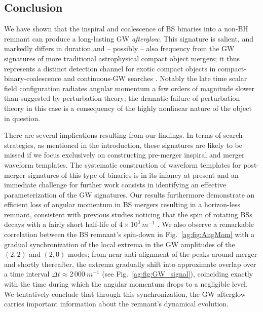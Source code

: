 \subsection{Conclusion}\label{ag:sec:conclusion}


We have shown that the inspiral and
coalescence of BS binaries into a non-BH remnant can produce a long-lasting GW {\it afterglow}.
This signature is salient, and markedly differs in duration and -- possibly -- also
frequency from the GW signatures of more traditional astrophysical compact object mergers;
it thus represents a distinct detection channel for exotic compact objects
in compact-binary-coalescence and continuous-GW searches
\cite{LIGOScientific:2019yhl,KAGRA:2021una,LIGOScientific:2021jlr,LIGOScientific:2021oez,LIGOScientific:2022lsr,LIGOScientific:2022pjk,LIGOScientific:2021hvc,LIGOScientific:2021ozr}.
\color{orchid} Notably the late time scalar field configuration radiates angular
momentum a few orders of magnitude slower than suggested by perturbation theory;
the dramatic failure of perturbation theory in this case is a consequency of
the highly nonlinear nature of the object in question.
\color{black}

There are several implications resulting from our
findings. In terms of search strategies, as mentioned in the introduction, these signatures are likely to be missed if we focus exclusively on constructing pre-merger inspiral and merger waveform templates. The systematic construction of waveform templates for post-merger signatures of this type of binaries
is in its infancy at present and an immediate challenge
for further work consists in identifying an effective
parameterization of the GW signatures. Our results furthermore
demonstrate an efficient loss of angular momentum in BS mergers
resulting in a horizon-less remnant, consistent with previous studies noticing that the spin of rotating BSs decays with a fairly short half-life of $4\times 10^3~m^{-1}$ \cite{Sanchis-Gual:2019ljs}. We also observe
a remarkable correlation between the BS remnant's spin-down
in Fig.~\ref{ag:fig:AngMom} with a gradual synchronization
of the local extrema in the GW amplitudes of the $(2,2)$
and $(2,0)$ modes; from near anti-alignment of the
peaks around merger and shortly thereafter, the extrema
gradually shift into approximate overlap over a time
interval $\Delta t \approx 2\,000~m^{-1}$ (see
Fig.~\ref{ag:fig:GW_signal}), coinciding
exactly with the time during which the angular momentum
drops to a negligible level.
We tentatively conclude that through this synchronization,
the GW afterglow carries important information about the remnant's dynamical evolution.

